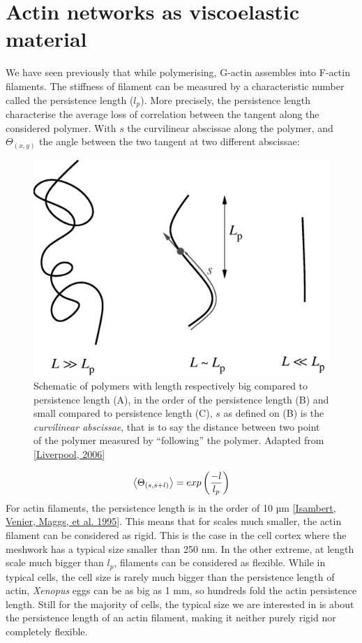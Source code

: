 \documentclass[A4paperpaper,11pt,english]{sphinxmanual}
\begin{document}
\section{Actin networks as viscoelastic material}
\label{parts/part1:viscoelastic}\label{parts/part1:actin-networks-as-viscoelastic-material}
We have seen previously that while polymerising, G-actin assembles into F-actin
filaments. The stiffness of filament can be measured by a characteristic number
called the persistence length (\(l_p\)). More precisely, the
persistence length characterise the average loss of correlation between the
tangent along the considered polymer. With \(s\) the curvilinear abscissae along the polymer, and \(\Theta_{(x,y)}\) the angle between the two tangent at two different abscissae:
\begin{figure}[htbp]
\centering
\capstart

\includegraphics[width=0.600\linewidth]{F2_large.jpg}
\caption{Schematic of polymers with length respectively big compared to persistence
length (A), in the order of the persistence length (B) and small compared
to persistence length (C), \(s\) as defined on (B) is the \emph{curvilinear
abscissae}, that is to say the distance between two point of the polymer
measured by ``following'' the polymer. Adapted from {\hyperref[parts/part1:liverpool2006]{{[}Liverpool,  2006{]}}}}\end{figure}
\begin{gather}
\begin{split}\left<\Theta_{(s,s+l)}\right> = exp\left(\frac{-l}{l_p}\right)\end{split}\notag
\end{gather}
For actin filaments, the
persistence length is in the order of 10 µm {\hyperref[parts/part1:isambert1995]{{[}Isambert, Venier, Maggs,  et al.  1995{]}}}. This means
that for scales much smaller, the actin filament can be considered as rigid.
This is the case in the cell cortex where the meshwork has a typical size smaller than 250 nm. In
the other extreme, at length scale much bigger than \(l_p\), filaments can
be considered as flexible. While in typical cells, the cell size is
rarely much bigger than the persistence length of actin, \emph{Xenopus} eggs can be
as big as 1 mm, so hundreds fold the actin persistence length.
Still for the majority of cells, the typical size we are interested in
is about the persistence length of an actin filament, making it neither purely
rigid nor completely flexible.
\end{document}
